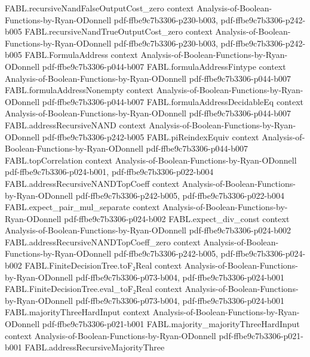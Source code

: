 \begin{theorem}
\proofstep
  {FABL.recursiveNandFalseOutputCost_zero}
  {context}
  {Analysis-of-Boolean-Functions-by-Ryan-ODonnell}
  {pdf-ffbe9c7b3306-p230-b003,
    pdf-ffbe9c7b3306-p242-b005}
\proofstep
  {FABL.recursiveNandTrueOutputCost_zero}
  {context}
  {Analysis-of-Boolean-Functions-by-Ryan-ODonnell}
  {pdf-ffbe9c7b3306-p230-b003,
    pdf-ffbe9c7b3306-p242-b005}
\proofstep
  {FABL.FormulaAddress}
  {context}
  {Analysis-of-Boolean-Functions-by-Ryan-ODonnell}
  {pdf-ffbe9c7b3306-p044-b007}
\proofstep
  {FABL.formulaAddressFintype}
  {context}
  {Analysis-of-Boolean-Functions-by-Ryan-ODonnell}
  {pdf-ffbe9c7b3306-p044-b007}
\proofstep
  {FABL.formulaAddressNonempty}
  {context}
  {Analysis-of-Boolean-Functions-by-Ryan-ODonnell}
  {pdf-ffbe9c7b3306-p044-b007}
\proofstep
  {FABL.formulaAddressDecidableEq}
  {context}
  {Analysis-of-Boolean-Functions-by-Ryan-ODonnell}
  {pdf-ffbe9c7b3306-p044-b007}
\proofstep
  {FABL.addressRecursiveNAND}
  {context}
  {Analysis-of-Boolean-Functions-by-Ryan-ODonnell}
  {pdf-ffbe9c7b3306-p242-b005}
\proofstep
  {FABL.piReindexEquiv}
  {context}
  {Analysis-of-Boolean-Functions-by-Ryan-ODonnell}
  {pdf-ffbe9c7b3306-p044-b007}
\proofstep
  {FABL.topCorrelation}
  {context}
  {Analysis-of-Boolean-Functions-by-Ryan-ODonnell}
  {pdf-ffbe9c7b3306-p024-b001,
    pdf-ffbe9c7b3306-p022-b004}
\proofstep
  {FABL.addressRecursiveNANDTopCoeff}
  {context}
  {Analysis-of-Boolean-Functions-by-Ryan-ODonnell}
  {pdf-ffbe9c7b3306-p242-b005,
    pdf-ffbe9c7b3306-p022-b004}
\proofstep
  {FABL.expect_pair_mul_separate}
  {context}
  {Analysis-of-Boolean-Functions-by-Ryan-ODonnell}
  {pdf-ffbe9c7b3306-p024-b002}
\proofstep
  {FABL.expect_div_const}
  {context}
  {Analysis-of-Boolean-Functions-by-Ryan-ODonnell}
  {pdf-ffbe9c7b3306-p024-b002}
\proofstep
  {FABL.addressRecursiveNANDTopCoeff_zero}
  {context}
  {Analysis-of-Boolean-Functions-by-Ryan-ODonnell}
  {pdf-ffbe9c7b3306-p242-b005,
    pdf-ffbe9c7b3306-p024-b002}
\proofstep
  {FABL.FiniteDecisionTree.toF₂Real}
  {context}
  {Analysis-of-Boolean-Functions-by-Ryan-ODonnell}
  {pdf-ffbe9c7b3306-p073-b004,
    pdf-ffbe9c7b3306-p024-b001}
\proofstep
  {FABL.FiniteDecisionTree.eval_toF₂Real}
  {context}
  {Analysis-of-Boolean-Functions-by-Ryan-ODonnell}
  {pdf-ffbe9c7b3306-p073-b004,
    pdf-ffbe9c7b3306-p024-b001}
\proofstep
  {FABL.majorityThreeHardInput}
  {context}
  {Analysis-of-Boolean-Functions-by-Ryan-ODonnell}
  {pdf-ffbe9c7b3306-p021-b001}
\proofstep
  {FABL.majority_majorityThreeHardInput}
  {context}
  {Analysis-of-Boolean-Functions-by-Ryan-ODonnell}
  {pdf-ffbe9c7b3306-p021-b001}
\proofstep
  {FABL.addressRecursiveMajorityThree}

\end{theorem}
